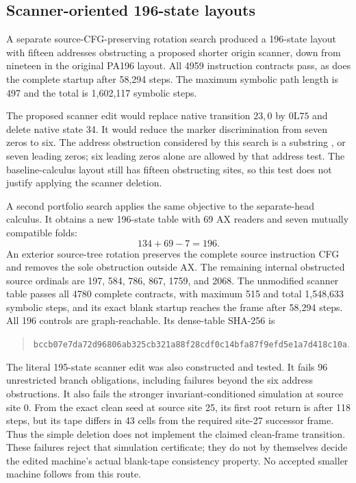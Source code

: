 \subsection{Scanner-oriented 196-state layouts}
A separate source-CFG-preserving rotation search produced a 196-state layout with fifteen addresses obstructing a proposed shorter origin scanner, down from nineteen in the original PA196 layout. All 4959 instruction contracts pass, as does the complete startup after 58,294 steps. The maximum symbolic path length is 497 and the total is 1,602,117 symbolic steps.

The proposed scanner edit would replace native transition $23,0$ by $0\mathrm L75$ and delete native state 34. It would reduce the marker discrimination from seven zeros to six. The address obstruction considered by this search is a substring , or seven leading zeros; six leading zeros alone are allowed by that address test. The baseline-calculus layout still has fifteen obstructing sites, so this test does not justify applying the scanner deletion.

A second portfolio search applies the same objective to the separate-head calculus. It obtains a new 196-state table with 69 AX readers and seven mutually compatible folds:
\[
134+69-7=196.
\]
An exterior source-tree rotation preserves the complete source instruction CFG and removes the sole obstruction outside AX. The remaining internal obstructed source ordinals are 197, 584, 786, 867, 1759, and 2068. The unmodified scanner table passes all 4780 complete contracts, with maximum 515 and total 1,548,633 symbolic steps, and its exact blank startup reaches the frame after 58,294 steps. All 196 controls are graph-reachable. Its dense-table SHA-256 is
\begin{quote}\small\nolinkurl{bccb07e7da72d96806ab325cb321a88f28cdf0c14bfa87f9efd5e1a7d418c10a}.\end{quote}

The literal 195-state scanner edit was also constructed and tested. It fails 96 unrestricted branch obligations, including failures beyond the six address obstructions. It also fails the stronger invariant-conditioned simulation at source site 0. From the exact clean seed at source site 25, its first root return is after 118 steps, but its tape differs in 43 cells from the required site-27 successor frame. Thus the simple deletion does not implement the claimed clean-frame transition. These failures reject that simulation certificate; they do not by themselves decide the edited machine's actual blank-tape consistency property. No accepted smaller machine follows from this route.

